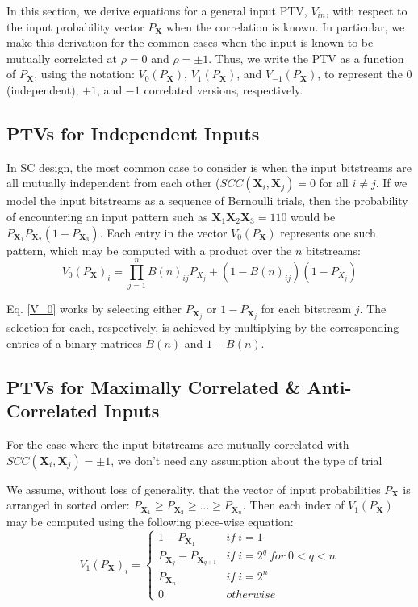 \documentclass[conference]{IEEEtran}
\begin{document}
In this section, we derive equations for a general input PTV, $V_{in}$, with respect to the input probability vector $P_{\mathbf{X}}$ when the correlation is known. In particular, we make this derivation for the common cases when the input is known to be mutually correlated at $\rho = 0$ and $\rho = \pm 1$. Thus, we write the PTV as a function of $P_{\mathbf{X}}$, using the notation: $V_0(P_{\mathbf{X}})$, $V_{1}(P_{\mathbf{X}})$, and $V_{-1}(P_{\mathbf{X}})$, to represent the $0$ (independent), $+1$, and $-1$ correlated versions, respectively.

\subsection{PTVs for Independent Inputs}
In SC design, the most common case to consider is when the input bitstreams are all mutually independent from each other ($SCC(\mathbf{X}_i, \mathbf{X}_j) = 0$ for all $i \neq j$. If we model the input bitstreams as a sequence of Bernoulli trials, then the probability of encountering an input pattern such as $\mathbf{X}_1\mathbf{X}_2\mathbf{X}_3 = 110$ would be $P_{\mathbf{X}_1}P_{\mathbf{X}_2}(1-P_{\mathbf{X}_3})$. Each entry in the vector $V_0(P_{\mathbf{X}})$ represents one such pattern, which may be computed with a product over the $n$ bitstreams:
\begin{equation}\label{V_0}
V_0(P_{\mathbf{X}})_i = \prod_{j=1}^n B(n)_{ij}P_{X_j} + (1-B(n)_{ij})(1-P_{X_j})
\end{equation}

Eq. \ref{V_0} works by selecting either $P_{\mathbf{X}_j}$ or $1-P_{\mathbf{X}_j}$ for each bitstream $j$. The selection for each, respectively, is achieved by multiplying by the corresponding entries of a binary matrices $B(n)$ and $1-B(n)$.


\subsection{PTVs for Maximally Correlated \& Anti-Correlated Inputs}
For the case where the input bitstreams are mutually correlated with  $SCC(\mathbf{X}_i, \mathbf{X}_j) = \pm 1$, we don't need any assumption about the type of trial 

We assume, without loss of generality, that the vector of input probabilities $P_{\mathbf{X}}$ is arranged in sorted order: $P_{\mathbf{X}_1} \geq P_{\mathbf{X}_2} \geq ... \geq P_{\mathbf{X}_n}$. Then each index of $V_1(P_{\mathbf{X}})$ may be computed using the following piece-wise equation: 
\begin{equation}\label{V_1}
    V_1(P_{\mathbf{X}})_i =
    \begin{cases}
        1 - P_{\mathbf{X}_1} & if \ i = 1 \\
        P_{\mathbf{X}_q} - P_{\mathbf{X}_{q+1}} & if \ i = 2^q \ for \ 0 < q < n\\
        P_{\mathbf{X}_n} & if \ i = 2^n \\
        0 & otherwise
    \end{cases}
\end{equation}
\end{document}

